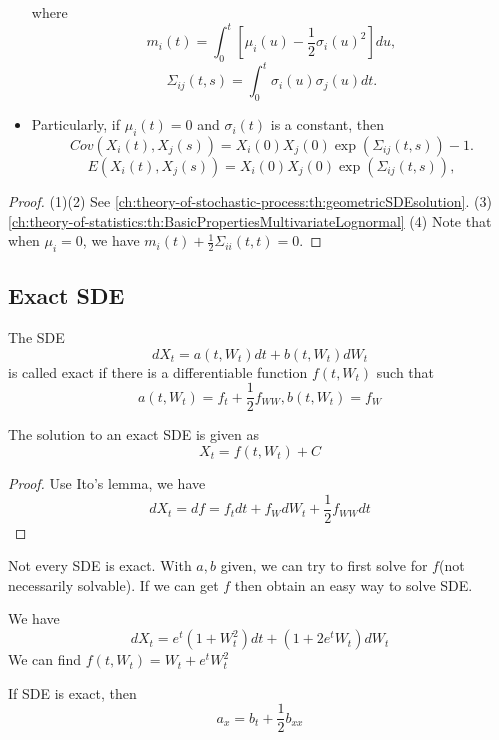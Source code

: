 \begin{refsection}
\begin{lemma}
\begin{itemize}
		where $$m_i(t) = \int_0^t[\mu_i(u)-\frac{1}{2}\sigma_i(u)^2]du, $$
		$$\Sigma_{ij}(t,s) = \int_0^t \sigma_i(u)\sigma_j(u)dt.$$
		\item Particularly, if $\mu_i(t) = 0$ and $\sigma_i(t)$ is a constant, then
		$$Cov(X_i(t),X_j(s)) = X_i(0)X_j(0)\exp(\Sigma_{ij}(t,s)) - 1.$$
		$$E(X_i(t),X_j(s)) = X_i(0)X_j(0)\exp(\Sigma_{ij}(t,s)),$$
		
	\end{itemize}
\end{lemma}
\begin{proof}
	(1)(2) See \autoref{ch:theory-of-stochastic-process:th:geometricSDEsolution}.
	(3) \autoref{ch:theory-of-statistics:th:BasicPropertiesMultivariateLognormal}
	(4) Note that when $\mu_i = 0$, we have $m_i(t) + \frac{1}{2}\Sigma_{ii}(t,t) = 0.$
\end{proof}

\subsection{Exact SDE}
\begin{definition}
	\cite[151]{calin2012introduction} The SDE
	$$dX_t = a(t,W_t)dt + b(t,W_t)dW_t$$
	is called exact if there is a differentiable function $f(t,W_t)$ such that
	$$a(t,W_t)=f_t + \frac{1}{2}f_{WW},b(t,W_t)=f_W$$
\end{definition}

\begin{lemma}
	The solution to an exact SDE is given as $$X_t = f(t,W_t) + C$$
\end{lemma}
\begin{proof}
	Use Ito's lemma, we have
	$$dX_t = df = f_tdt + f_W dW_t +\frac{1}{2}f_{WW}dt$$
\end{proof}



\begin{remark}
	Not every SDE is exact. With $a,b$ given, we can try to first solve for $f$(not necessarily solvable). If we can get $f$ then obtain an easy way to solve SDE.
\end{remark}

\begin{example}
	\cite[151]{calin2012introduction} We have
	$$dX_t = e^t(1+W_t^2)dt + (1+2e^tW_t)dW_t$$
	We can find $f(t,W_t) = W_t + e^t W_t^2$
	
\end{example}

\begin{theorem}
	\cite[152]{calin2012introduction} If SDE is exact, then
	$$a_x = b_t + \frac{1}{2}b_{xx}$$
\end{theorem}

\end{refsection}
